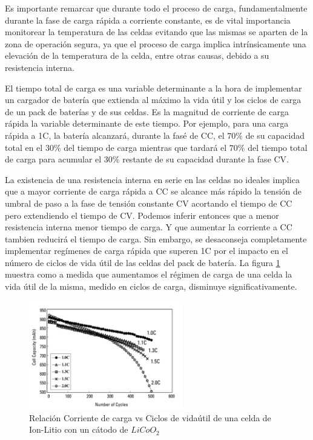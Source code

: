 \documentclass[10pt,a4paper]{article}
\begin{document}
Es importante remarcar que durante todo el proceso de carga, 
fundamentalmente durante la fase de carga rápida a corriente constante, es de
vital importancia monitorear la temperatura de las celdas evitando que las
mismas se aparten de la zona de operación segura, ya que el proceso de carga
implica intrínsicamente una elevación de la temperatura de la celda, entre otras
causas, debido a su resistencia interna.

El tiempo total de carga es una variable determinante a la hora de implementar
un cargador de batería que extienda al máximo la vida útil y los ciclos de carga
de un pack de baterías y de sus celdas. Es la magnitud de corriente de carga
rápida la variable determinante de este tiempo. Por ejemplo, para una
carga rápida a 1C, la batería alcanzará, durante la fasé de \acrshort{CC}, el
$70\%$ de su capacidad total en el $30\%$ del tiempo de carga mientras que
tardará el $70\%$ del tiempo total de carga para acumular el $30\%$ restante de
su capacidad durante la fase \acrshort{CV}. 

La existencia de una resistencia interna en serie en las celdas no ideales
implica que a mayor corriente de carga rápida a CC se alcance más rápido la
tensión de umbral de paso a la fase de tensión constante CV acortando el tiempo
de CC pero extendiendo el tiempo de CV. Podemos inferir entonces que a menor
resistencia interna menor tiempo de carga. Y que aumentar la corriente a CC
tambien reducirá el tiempo de carga.  Sin embargo, se desaconseja completamente
implementar regímenes de carga rápida que superen 1C por el impacto en el número
de ciclos de vida útil de las celdas del pack de batería. La figura
\ref{fig:C_vs_Cycle_I} muestra como a medida que aumentamos el régimen de carga
de una celda la vida \'util de la misma, medido en ciclos de carga, disminuye
significativamente.

\begin{figure}[h!] \centering
    \includegraphics[width=0.6\textwidth]{bat_char/C_vs_Cycle_I.png}
    \caption{Relación Corriente de carga vs Ciclos de vidaútil de una celda de
    Ion-Litio con un cátodo de $LiCoO_2$} \label{fig:C_vs_Cycle_I} 
\end{figure}
\FloatBarrier
\end{document}
